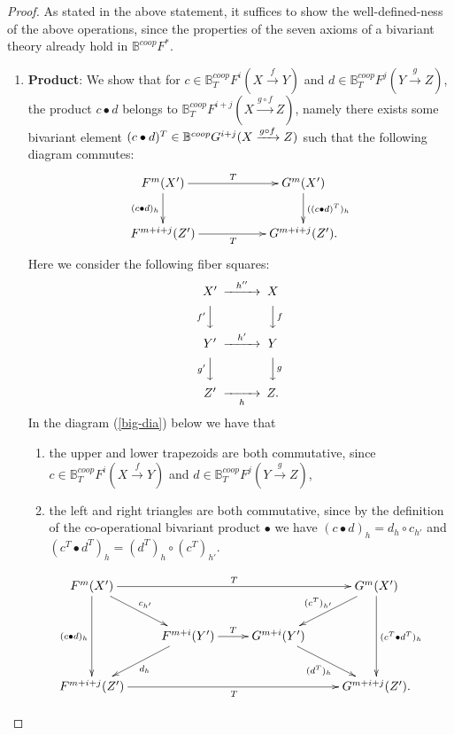 \documentclass[a4paper]{amsart}
\begin{document}
\begin{proof}
As stated in the above statement, it suffices to show the well-defined-ness of the above operations, since the properties of the seven axioms of a bivariant theory already hold in $\mathbb B^{coop}F^*$.
\begin{enumerate}
\item {\bf Product}: We show that for $c \in \mathbb B^{coop}_TF^i(X \xrightarrow f Y) $ and $d \in \mathbb B^{coop}_TF^j(Y \xrightarrow g Z) $, the product
$c \bullet d$ belongs to $\mathbb B^{coop}_TF^{i+j}(X \xrightarrow {g \circ f} Z)$, namely there exists some bivariant element $(c \bullet d)^T \in \mathbb B^{coop}G^{i+j}(X \xrightarrow {g \circ f} Z)$ such that the following diagram commutes:
\begin{equation}\label{dia-1}
\xymatrix
{
F^m(X')  \ar[d]_{(c \bullet d)_h} \ar[rr]^{T} && G^m(X') \ar[d]^{((c \bullet d)^T)_h}\\
F^{m+i+j}(Z') \ar[rr]_{T}  && G^{m+i+j}(Z').  \\
}
\end{equation}
Here we consider the following fiber squares:
\begin{equation}\label{cd-1-1}
\CD
X' @> {h''} >> X \\
@V {f'}VV @VV {f}V\\
Y' @> {h'} >> Y \\
@V {g'}VV @VV {g}V \\
Z'  @>> {h} > Z. \endCD 
\end{equation}
In the diagram (\ref{big-dia}) below we have that
\begin{enumerate}
\item the upper and lower trapezoids are both commutative, since $c \in \mathbb B^{coop}_TF^i(X \xrightarrow f Y) $ and $d \in \mathbb B^{coop}_TF^j(Y \xrightarrow g Z) $, 
\item the left and right triangles are both commutative, since by the definition of the co-operational bivariant product $\bullet$ we have
$(c \bullet d)_h = d_h \circ c_{h'}$ and $(c^T \bullet d^T)_h = (d^T)_h \circ (c^T)_{h'}$.
\end{enumerate}
\begin{equation}\label{big-dia}
\xymatrix
{
F^m(X')  \ar[dd]_{(c \bullet d)_h} \ar[dr]^{c_{h'}} \ar[rrr]^{T} &&& G^m(X')  \ar[dl]_{(c^T)_{h'}} \ar[dd]^{(c^T \bullet d^T)_h}\\
& F^{m+i}(Y')  \ar[r]^{T} \ar[dl]^{d_h} & G^{m+i}(Y')  \ar[dr]_{(d^T)_h}\\
F^{m+i+j}(Z') \ar[rrr]_{T}  &&& G^{m+i+j}(Z').  \\
}
\end{equation}
\end{enumerate}
\end{proof}
\end{document}
